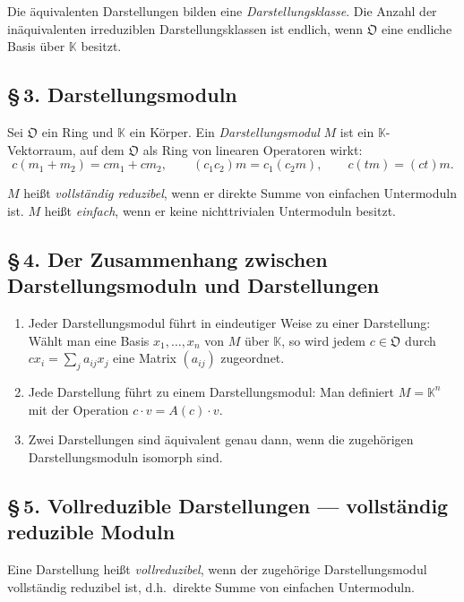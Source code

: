 \documentclass[10pt,a4paper]{article}
\theoremstyle{plain}
\theoremstyle{definition}
\theoremstyle{remark}
\newcommand{\KK}{\mathbb{K}}
\newcommand{\cO}{\mathfrak{O}}
\begin{document}
Die \"aquivalenten Darstellungen bilden eine \emph{Darstellungsklasse}. Die Anzahl der in\"aquivalenten irreduziblen Darstellungsklassen ist endlich, wenn $\cO$ eine endliche Basis \"uber $\KK$ besitzt.

\subsection*{\S\,3. Darstellungsmoduln}

Sei $\cO$ ein Ring und $\KK$ ein K\"orper. Ein \emph{Darstellungsmodul} $M$ ist ein $\KK$-Vektorraum, auf dem $\cO$ als Ring von linearen Operatoren wirkt:
\[
c(m_1 + m_2) = cm_1 + cm_2, \qquad (c_1 c_2)m = c_1(c_2 m), \qquad c(tm) = (ct)m.
\]

$M$ hei\ss t \emph{vollst\"andig reduzibel}, wenn er direkte Summe von einfachen Untermoduln ist. $M$ hei\ss t \emph{einfach}, wenn er keine nichttrivialen Untermoduln besitzt.

\subsection*{\S\,4. Der Zusammenhang zwischen Darstellungsmoduln und Darstellungen}

\begin{enumerate}
\item Jeder Darstellungsmodul f\"uhrt in eindeutiger Weise zu einer Darstellung: W\"ahlt man eine Basis $x_1, \ldots, x_n$ von $M$ \"uber $\KK$, so wird jedem $c \in \cO$ durch $cx_i = \sum_j a_{ij} x_j$ eine Matrix $(a_{ij})$ zugeordnet.

\item Jede Darstellung f\"uhrt zu einem Darstellungsmodul: Man definiert $M = \KK^n$ mit der Operation $c \cdot v = A(c) \cdot v$.

\item Zwei Darstellungen sind \"aquivalent genau dann, wenn die zugeh\"origen Darstellungsmoduln isomorph sind.
\end{enumerate}

\subsection*{\S\,5. Vollreduzible Darstellungen --- vollst\"andig reduzible Moduln}

Eine Darstellung hei\ss t \emph{vollreduzibel}, wenn der zugeh\"orige Darstellungsmodul vollst\"andig reduzibel ist, d.h.\ direkte Summe von einfachen Untermoduln.
\end{document}
